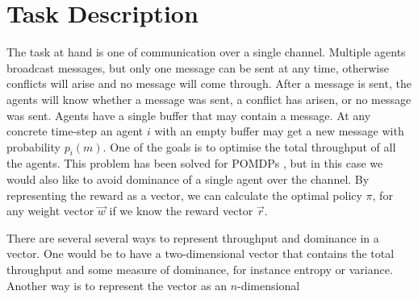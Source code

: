 \documentclass{article}
\begin{document}
	\maketitle
	\section{Task Description}
	\label{sec:task_description}
		The task at hand is one of communication over a single channel.
		Multiple agents broadcast messages, but only one message can be sent at
		any time, otherwise conflicts will arise and no message will come
		through. After a message is sent, the agents will know whether a message
		was sent, a conflict has arisen, or no message was sent.
		Agents have a single buffer that may contain a message. At any concrete
		time-step an agent $i$ with an empty buffer may get a new message with
		probability $p_i(m)$.
		One of the goals is to optimise the total throughput of all the agents.
		This problem has been solved for POMDPs \cite{ooi1996decentralized}, but in this case we would
		also like to avoid dominance of a single agent over the channel.
		By representing the reward as a vector, we can calculate the optimal
		policy $\pi$, for any weight vector $\vec{w}$ if we know the reward
		vector $\vec{r}$.

		There are several several ways to represent throughput and dominance in a
		vector. One would be to have a two-dimensional vector that contains the
		total throughput and some measure of dominance, for instance entropy or
		variance.
		Another way is to represent the vector as an $n$-dimensional 
		
		
\end{document}
